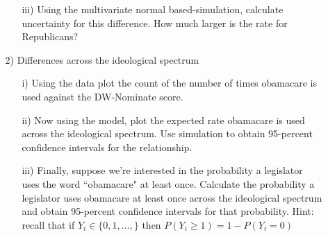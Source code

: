 \documentclass[letterpaper,12pt]{article}
\numberwithin{equation}{section}
\numberwithin{equation}{section}
\begin{document}
\begin{itemize}
\begin{itemize}
\begin{itemize}
\item[iii)] Using the multivariate normal based-simulation, calculate uncertainty for this difference.  How much larger is the rate for Republicans?
\end{itemize}
\item[2)]  Differences across the ideological spectrum
\begin{itemize}
\item[i)] Using the data plot the count of the number of times obamacare is used against the DW-Nominate score.
\item[ii)] Now using the model, plot the expected rate obamacare is used across the ideological spectrum.  Use simulation to obtain 95-percent confidence intervals for the relationship.
\item[iii)] Finally, suppose we're interested in the probability a legislator uses the word ``obamacare" at least once.  Calculate the probability a legislator uses obamacare at least once across the ideological spectrum and obtain 95-percent confidence intervals for that probability.  Hint: recall that if $Y_{i} \in \{0, 1, \hdots, \}$ then $P(Y_{i}\geq 1) = 1 - P(Y_{i} = 0 )$
\end{itemize}
\end{itemize}
\end{itemize}
\end{document}
